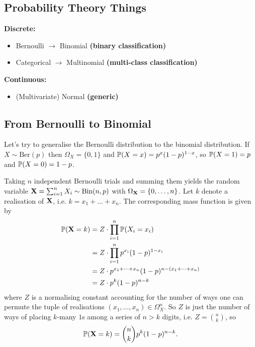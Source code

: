 \documentclass[11pt]{article}
\begin{document}
\newpage
\begin{appendices}

\section{Probability Theory Things}

\begin{tcolorbox}[colback=c5]
    \textbf{Discrete:}
    \begin{itemize}
        \item Bernoulli $\rightarrow$ Binomial \textbf{(binary classification)}
        \item Categorical $\rightarrow$ Multinomial \textbf{(multi-class classification)}
    \end{itemize}
\end{tcolorbox}

\begin{tcolorbox}[colback=c9]
    \textbf{Continuous:}
    \begin{itemize}
        \item (Multivariate) Normal \textbf{(generic)}
    \end{itemize}
\end{tcolorbox}

\subsection{From Bernoulli to Binomial}
Let's try to generalise the Bernoulli distribution to the binomial distribution. If $X\sim\text{Ber}(p)$ then $\Omega_X=\{0,1\}$ and $\P(X=x)=p^x(1-p)^{1-x}$, so $\P(X=1)=p$ and $\P(X=0)=1-p$.

Taking $n$ independent Bernoulli trials and summing them yields the random variable $\X=\sum_{i=1}^nX_i\sim\text{Bin}(n,p)$ with $\OX=\{0,\dots,n\}$. Let $k$ denote a realisation of $\X$, i.e. $k=x_1+\dots+x_n$. The corresponding mass function is given by
\begin{align*}
    \P(\X=k)
    &=
    Z\cdot\prod_{i=1}^n\P(X_i=x_i)\\
    &=
    Z\cdot\prod_{i=1}^np^{x_i}(1-p)^{1-x_i}\\
    &=
    Z\cdot p^{x_1+\dots+x_n}(1-p)^{n-(x_1+\dots+x_n)}\\
    &=
    Z\cdot p^k(1-p)^{n-k}
\end{align*}
where $Z$ is a normalising constant accounting for the number of ways one can permute the tuple of realisations $(x_1,\dots,x_n)\in\Omega_{X}^n$. So $Z$ is just the number of ways of placing $k$-many $1$s among a series of $n>k$ digits, i.e. $Z=\binom{n}{k}$, so
$$
\P(\X=k)
=
\binom{n}{k}p^k(1-p)^{n-k}.
$$


\end{appendices}
\end{document}
